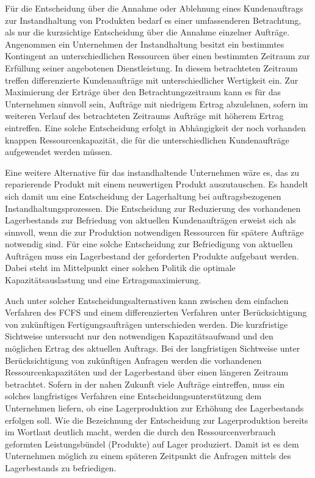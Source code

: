 Für die Entscheidung über die Annahme oder Ablehnung eines Kundenauftrags zur Instandhaltung von Produkten bedarf es einer umfassenderen Betrachtung, als nur die kurzsichtige Entscheidung über die Annahme einzelner Aufträge. Angenommen ein Unternehmen der Instandhaltung besitzt ein bestimmtes Kontingent an unterschiedlichen Ressourcen über einen bestimmten Zeitraum zur Erfüllung seiner angebotenen Dienstleistung. In diesem betrachteten Zeitraum treffen differenzierte Kundenaufträge mit unterschiedlicher Wertigkeit ein. Zur Maximierung der Erträge über den Betrachtungszeitraum kann es für das Unternehmen sinnvoll sein, Aufträge mit niedrigem Ertrag abzulehnen, sofern im weiteren Verlauf des betrachteten Zeitraums Aufträge mit höherem Ertrag eintreffen. Eine solche Entscheidung erfolgt in Abhängigkeit der noch vorhanden knappen Ressourcenkapazität, die für die unterschiedlichen Kundenaufträge aufgewendet werden müssen.

Eine weitere Alternative für das instandhaltende Unternehmen wäre es, das zu reparierende Produkt mit einem neuwertigen Produkt auszutauschen. Es handelt sich damit um eine Entscheidung der Lagerhaltung bei auftragsbezogenen Instandhaltungsprozessen. Die Entscheidung zur Reduzierung des vorhandenen Lagerbestands zur Befriedung von aktuellen Kundenaufträgen erweist sich als sinnvoll, wenn die zur Produktion notwendigen Ressourcen für spätere Aufträge notwendig sind. Für eine solche Entscheidung zur Befriedigung von aktuellen Aufträgen muss ein Lagerbestand der geforderten Produkte aufgebaut werden. Dabei steht im Mittelpunkt einer solchen Politik die optimale Kapazitätsauslastung und eine Ertragsmaximierung.

Auch unter solcher Entscheidungsalternativen kann zwischen dem einfachen Verfahren des FCFS und einem differenzierten Verfahren unter Berücksichtigung von zukünftigen Fertigungsaufträgen unterschieden werden. Die kurzfristige Sichtweise untersucht nur den notwendigen Kapazitätsaufwand und den möglichen Ertrag des aktuellen Auftrags. Bei der langfristigen Sichtweise unter Berücksichtigung von zukünftigen Anfragen werden die vorhandenen Ressourcenkapazitäten und der Lagerbestand über einen längeren Zeitraum betrachtet. Sofern in der nahen Zukunft viele Aufträge eintreffen, muss ein solches langfristiges Verfahren eine Entscheidungsunterstützung dem Unternehmen liefern, ob eine Lagerproduktion zur Erhöhung des Lagerbestands erfolgen soll. Wie die Bezeichnung der Entscheidung zur Lagerproduktion bereits im Wortlaut deutlich macht, werden die durch den Ressourcenverbrauch geformten Leistungsbündel (Produkte) auf Lager produziert. Damit ist es dem Unternehmen möglich zu einem späteren Zeitpunkt die Anfragen mittels des Lagerbestands zu befriedigen.

